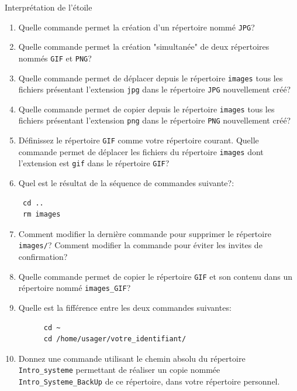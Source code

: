 \begin{exercice}
  \begin{exercicelet}{Interprétation de l'étoile}
    \begin{enumerate}\setcounter{enumi}{\value{cnti}}
    \item Quelle commande permet la création d'un répertoire nommé
      \texttt{JPG}?
    \item Quelle commande permet la création "simultanée" de deux
      répertoires nommés \texttt{GIF} et \texttt{PNG}?
    \item Quelle commande permet de déplacer depuis le répertoire
      \texttt{images} tous les fichiers présentant l'extension
      \texttt{jpg} dans le répertoire \texttt{JPG} nouvellement créé?
    \item Quelle commande permet de copier depuis le répertoire
      \texttt{images} tous les fichiers présentant l'extension
      \texttt{png} dans le répertoire \texttt{PNG} nouvellement créé?
    \item Définissez le répertoire \texttt{GIF} comme votre répertoire
      courant. Quelle commande permet de déplacer les fichiers du
      répertoire \texttt{images} dont l'extension est \texttt{gif} dans
      le répertoire \texttt{GIF}?
    \item Quel est le résultat de la séquence de commandes suivante?:
\begin{verbatim}
 cd ..
 rm images
\end{verbatim}
    \item Comment modifier la dernière commande pour supprimer le
      répertoire \texttt{images/}? Comment modifier la commande pour
      éviter les invites de confirmation?
    \item Quelle commande permet de copier le répertoire \texttt{GIF} et
      son contenu dans un répertoire nommé \verb|images_GIF|?
    \item Quelle est la fifférence entre les deux commandes suivantes:
\begin{verbatim}
      cd ~
      cd /home/usager/votre_identifiant/
\end{verbatim}
    \item Donnez une commande utilisant le chemin absolu du répertoire
      \verb|Intro_systeme| permettant de réaliser un copie nommée
      \verb|Intro_Systeme_BackUp| de ce répertoire, dans votre
      répertoire personnel.  \setcounter{cnti}{\value{enumi}}
    \end{enumerate}
  \end{exercicelet}
\end{exercice}
